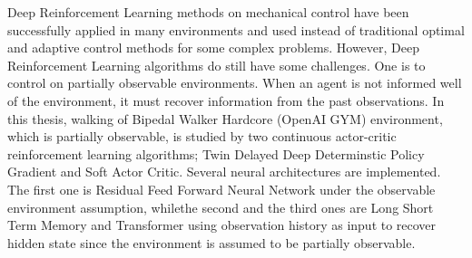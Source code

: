 Deep Reinforcement Learning methods on mechanical control have been successfully applied in many environments and used instead of traditional optimal and adaptive control methods for some complex problems. 
However, Deep Reinforcement Learning algorithms do still have some challenges. 
One is to control on partially observable environments. 
When an agent is not informed well of the environment, it must recover information from the past observations. 
In this thesis, walking of Bipedal Walker Hardcore (OpenAI GYM) environment, 
which is partially observable, 
is studied by two continuous actor-critic reinforcement learning algorithms; Twin Delayed Deep Determinstic Policy Gradient and Soft Actor Critic.
Several neural architectures are implemented. 
The first one is Residual Feed Forward Neural Network under the observable environment assumption, 
whilethe  second and the third ones are Long Short Term Memory and Transformer using observation history as input to recover hidden state since the environment is assumed to be partially observable. 
